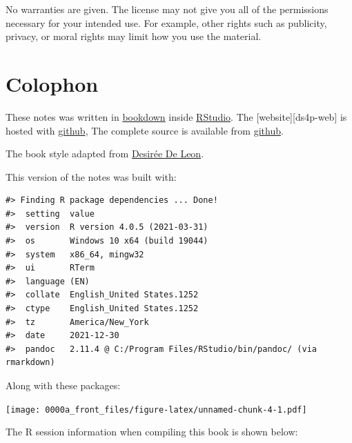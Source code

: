 \documentclass[
]{book}
\begin{document}
No warranties are given. The license may not give you all of the
permissions necessary for your intended use. For example, other rights
such as publicity, privacy, or moral rights may limit how you use the
material.

\hypertarget{colophon}{%
\chapter*{Colophon}\label{colophon}}

These notes was written in \href{http://bookdown.org/}{bookdown} inside \href{http://www.rstudio.com/ide/}{RStudio}. The {[}website{]}{[}ds4p-web{]} is hosted with \href{https://www.github.com}{github}, The complete source is available from \href{https://github.com/smasongarrison/syllabi}{github}.

The book style adapted from \href{https://desiree.rbind.io/}{Desirée De Leon}.

This version of the notes was built with:

\begin{verbatim}
#> Finding R package dependencies ... Done!
#>  setting  value
#>  version  R version 4.0.5 (2021-03-31)
#>  os       Windows 10 x64 (build 19044)
#>  system   x86_64, mingw32
#>  ui       RTerm
#>  language (EN)
#>  collate  English_United States.1252
#>  ctype    English_United States.1252
#>  tz       America/New_York
#>  date     2021-12-30
#>  pandoc   2.11.4 @ C:/Program Files/RStudio/bin/pandoc/ (via rmarkdown)
\end{verbatim}

Along with these packages:

\texttt{[image: 0000a\_front\_files/figure-latex/unnamed-chunk-4-1.pdf]}

The R session information when compiling this book is shown below:
\end{document}
